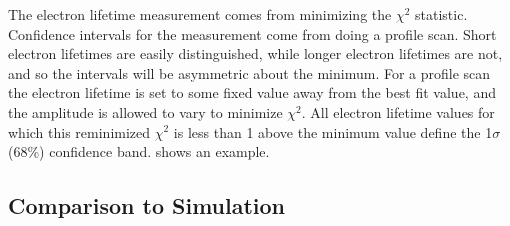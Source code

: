 \documentclass[herrin-thesis.tex]{subfiles}
\begin{document}
The electron lifetime measurement comes from minimizing the \(\chi^2\) statistic. Confidence intervals for the measurement come from doing a profile scan. Short electron lifetimes are easily distinguished, while longer electron lifetimes are not, and so the intervals will be asymmetric about the minimum. For a profile scan the electron lifetime is set to some fixed value away from the best fit value, and the amplitude is allowed to vary to minimize \(\chi^2\). All electron lifetime values for which this reminimized \(\chi^2\) is less than 1 above the minimum value define the 1\(\sigma\) (68\%) confidence band.  shows an example.

\subsection{Comparison to Simulation}
\end{document}
